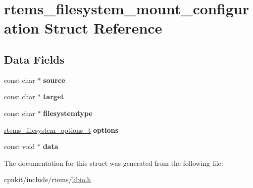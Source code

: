 \hypertarget{structrtems__filesystem__mount__configuration}{}\section{rtems\+\_\+filesystem\+\_\+mount\+\_\+configuration Struct Reference}
\label{structrtems__filesystem__mount__configuration}
\subsection*{Data Fields}
\begin{DoxyCompactItemize}
\item 
\mbox{\label{structrtems__filesystem__mount__configuration_a107d04ab0d9b805745c2b209220fec59}} 
const char $\ast$ {\bfseries source}
\item 
\mbox{\label{structrtems__filesystem__mount__configuration_aa12c994fad450c80773de967b006904e}} 
const char $\ast$ {\bfseries target}
\item 
\mbox{\label{structrtems__filesystem__mount__configuration_a326cc3bdf26d14812c6d08a67480d904}} 
const char $\ast$ {\bfseries filesystemtype}
\item 
\mbox{\label{structrtems__filesystem__mount__configuration_aabec60944b9b54abee28d04dcad0732b}} 
\mbox{\hyperlink{group__FileSystemTypesAndMount_gabb3a23ee6b6e7aacb719a1a81716af7a}{rtems\+\_\+filesystem\+\_\+options\+\_\+t}} {\bfseries options}
\item 
\mbox{\label{structrtems__filesystem__mount__configuration_a49d18fee2e5511e8d0bd57f059a59b3a}} 
const void $\ast$ {\bfseries data}
\end{DoxyCompactItemize}


The documentation for this struct was generated from the following file\+:\begin{DoxyCompactItemize}
\item 
cpukit/include/rtems/\mbox{\hyperlink{libio_8h}{libio.\+h}}\end{DoxyCompactItemize}
